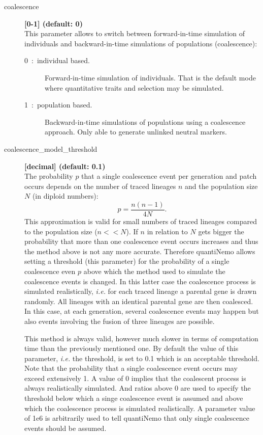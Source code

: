 \documentclass[letterpaper,12pt,oneside]{book}
\begin{document}
\begin{description}
\item[coalescence] \textbf{[0-1] (default: 0)}\\ 
This parameter allows to switch between forward-in-time simulation of individuals and backward-in-time simulations of populations (coalescence):
\begin{description}
\item[0~:~individual based.] Forward-in-time simulation of individuals. That is the default mode where quantitative traits and selection may be simulated. 
\item[1~:~population based.] Backward-in-time simulations of populations using a coalescence approach. Only able to generate unlinked neutral markers.
\end{description}

\item[coalescence\_model\_threshold] \textbf{[decimal] (default: 0.1)}\\ 
The probability $p$ that a single coalescence event per generation and patch occurs depends on the number of traced lineages $n$ and the population size $N$ (in diploid numbers):
    \[
    p = \frac{n(n-1)}{4N}.
\]  
This approximation is valid for small numbers of traced lineages compared to the population size ($n<<N$). If $n$ in relation to $N$ gets bigger the probability that more than one coalescence event occurs increases and thus the method above is not any more accurate. Therefore quantiNemo allows setting a threshold (this parameter) for the probability of a single coalescence even $p$ above which the method used to simulate the coalescence events is changed. In this latter case the coalescence process is simulated realistically, \textit{i.e.} for each traced lineage a parental gene is drawn randomly. All lineages with an identical parental gene are then coalesced. In this case, at each generation, several coalescence events may happen but also events involving the fusion of three lineages are possible. 

This method is always valid, however much slower in terms of computation time than the previously mentioned one. By default the value of this parameter, \textit{i.e.} the threshold, is set to 0.1 which is an acceptable threshold. Note that the probability that a single coalescence event occurs may exceed extensively 1. A value of 0 implies that the coalescent process is always realistically simulated. And ratios above 0 are used to specify the threshold below which a singe coalescence event is assumed and above which the coalescence process is simulated realistically. A parameter value of 1e6 is arbitrarily used to tell quantiNemo that only single coalescence events should be assumed.    


\end{description}
\end{document}
